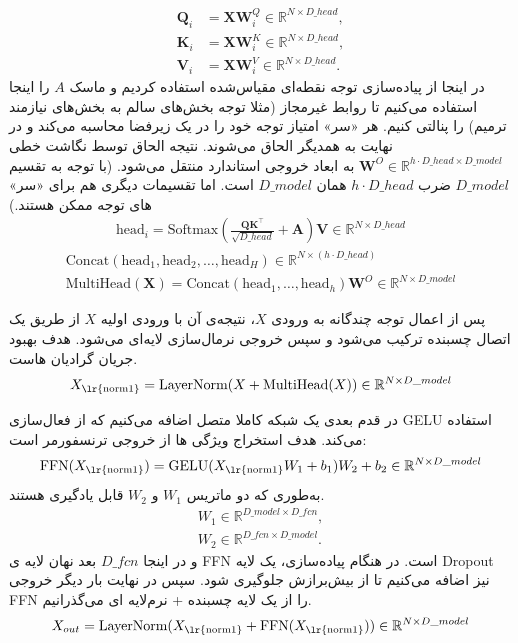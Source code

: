 \begin{align*}
	\mathbf{Q}_i &= \mathbf{X} \mathbf{W}_i^Q \in \mathbb{R}^{N \times D\_{head}}, \\
	\mathbf{K}_i &= \mathbf{X} \mathbf{W}_i^K \in \mathbb{R}^{N \times D\_{head}}, \\
	\mathbf{V}_i &= \mathbf{X} \mathbf{W}_i^V \in \mathbb{R}^{N \times D\_{head}}.
\end{align*}
در اینجا از پیاده‌سازی توجه نقطه‌ای مقیاس‌شده استفاده کردیم  و ماسک $A$ را اینجا استفاده می‌کنیم تا روابط غیرمجاز (مثلا توجه بخش‌های سالم به بخش‌های نیازمند ترمیم) را پنالتی کنیم. هر «سر» امتیاز توجه خود را در یک زیرفضا محاسبه می‌کند و در نهایت به همدیگر الحاق می‌شوند. نتیجه الحاق توسط نگاشت خطی 
$\mathbf{W}^O\in  \mathbb{R}^{h \cdot D\_{head} \times D\_{model}}$ 
به ابعاد خروجی استاندارد منتقل می‌شود. (با توجه به تقسیم 
$D\_{model}$ ضرب $h \cdot D\_{head}$
همان $D\_{model}$ است. اما تقسیمات دیگری هم برای «سر» های توجه ممکن هستند.)
\begin{align}
	\text{head}_{i} =
	\text{Softmax}\left(\frac{\mathbf{Q} \mathbf{K}^\top}{\sqrt{D\_{head}}} + \mathbf{A} \right) \mathbf{V} \in \mathbb{R}^{N \times D\_{head}}
\end{align}
\begin{gather*}
	\text{Concat}(\text{head}_1, \text{head}_2, \dots, \text{head}_H)  \in \mathbb{R}^{N \times (h \cdot D\_{head})} \\
	\text{MultiHead}(\mathbf{X}) = \text{Concat}(\text{head}_1, \dots, \text{head}_h)\mathbf{W}^O  \in \mathbb{R}^{N \times D\_{model}}
\end{gather*}

پس از اعمال توجه چندگانه به ورودی $X$، نتیجه‌ی آن با ورودی اولیه $X$ از طریق یک اتصال چسبنده ترکیب می‌شود و سپس خروجی نرمال‌سازی لایه‌ای می‌شود. هدف بهبود جریان گرادیان هاست. 
$$
X_{\text{\lr{norm1}}} = \text{LayerNorm}(X + \text{MultiHead}(X)) \in \mathbb{R}^{N \times D\_{model}}
$$

در قدم بعدی یک شبکه کاملا متصل اضافه می‌کنیم که از فعال‌سازی GELU استفاده می‌کند. هدف استخراج ویژگی ها از خروجی ترنسفورمر است:
$$
\text{FFN}(X_{\text{\lr{norm1}}}) = \text{GELU}(X_{\text{\lr{norm1}}} W_1 + b_1) W_2 + b_2 \in \mathbb{R}^{N \times D\_{model}}
$$
به‌طوری که دو ماتریس $W_1 $ و $W_2 $ قابل یادگیری هستند.
\begin{align*}
	W_1 \in \mathbb{R}^{D\_{model} \times D\_{fcn}},\\
	W_2 \in \mathbb{R}^{D\_{fcn} \times D\_{model}}.
\end{align*}
و در اینجا $D\_{fcn}$ بعد نهان لایه ی FFN است.  در هنگام پیاده‌سازی، یک لایه Dropout نیز اضافه می‌کنیم تا از بیش‌برازش جلوگیری شود. سپس در نهایت بار دیگر خروجی FFN را از یک لایه چسبنده +‌ نرم‌لایه ای می‌گذرانیم.
$$
X_{out} = \text{LayerNorm}(X_{\text{\lr{norm1}}} + \text{FFN}(X_{\text{\lr{norm1}}})) \in \mathbb{R}^{N \times D\_{model}}
$$

